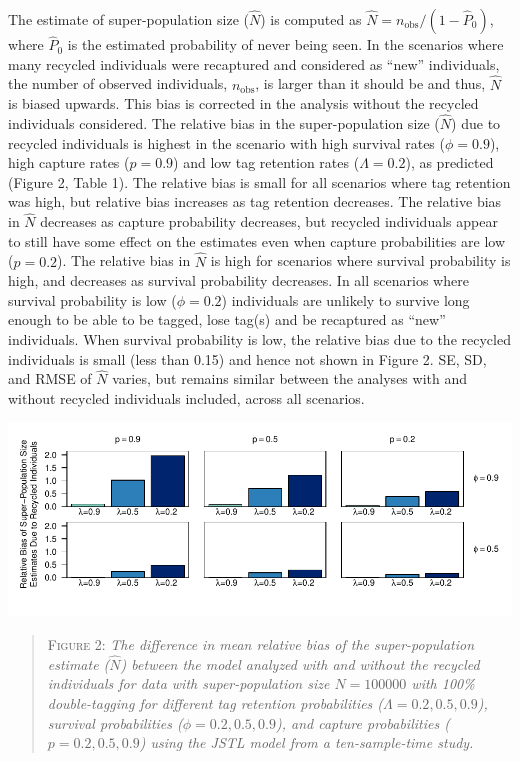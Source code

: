 \documentclass[12pt]{article}
\begin{document}
The estimate of super-population size (\(\hat{N}\)) is computed as
\(\hat{N}=n_{\text{obs}}/{(1-\hat{P}_0)}\), where \(\hat{P}_0\) is the
estimated probability of never being seen. In the scenarios where many
recycled individuals were recaptured and considered as ``new''
individuals, the number of observed individuals, \(n_{\text{obs}}\), is larger than it should  be and thus,
\(\hat{N}\) is biased upwards. This bias is corrected in the analysis
without the recycled individuals considered. The relative bias in the
super-population size (\(\hat{N}\)) due to recycled individuals is 
highest in the scenario with high survival rates (\(\phi=0.9\)), high
capture rates (\(p=0.9\)) and low tag retention rates (\(\Lambda=0.2\)),
as predicted (Figure 2, Table 1). The relative bias is small for all
scenarios where tag retention was high, but relative bias increases as
tag retention decreases. The relative bias in \(\hat{N}\) decreases as
capture probability decreases, but recycled individuals appear to still
have some effect on the estimates even when capture probabilities
are low (\(p=0.2\)). The relative bias in \(\hat{N}\) is high for
scenarios where survival probability is high, and decreases as
survival probability decreases. In all scenarios where survival probability is
low (\(\phi=0.2\)) individuals are unlikely to survive long enough to be
able to be tagged, lose tag(s) and be recaptured as  ``new''
individuals. When survival probability is low, the relative bias due to the recycled
individuals is small (less than 0.15) and hence not shown in Figure 2.
SE, SD, and RMSE of \(\hat{N}\) varies, but remains similar between the
analyses with and without recycled individuals included, across all
scenarios.

\includegraphics{RecycledPaper_files/figure-latex/Figure2_N-1.pdf}

\begin{quote}
\textsc{Figure 2:}
\textsl{The difference in mean relative bias of the super-population estimate ($\hat{N}$) between the model analyzed with and without the recycled individuals for data with super-population size $N=100 000$ with 100\% double-tagging for different tag retention probabilities ($\Lambda=0.2,0.5,0.9$), survival probabilities ($\phi=0.2,0.5,0.9$), and capture probabilities ($p=0.2,0.5,0.9$) using the JSTL model from a ten-sample-time study.}
\end{quote}
\end{document}
